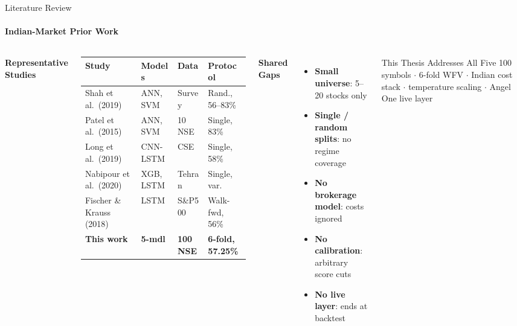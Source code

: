 \documentclass[10pt,aspectratio=43]{beamer}
\newcommand{\hl}[1]{\textcolor{primary}{\textbf{#1}}}
\newcommand{\rd}[1]{\textcolor{tertiary}{\textbf{#1}}}
\newcommand{\gd}[1]{\textcolor{secondary}{\textbf{#1}}}
\newcommand{\vsep}{\vspace{0.04cm}}
\newcommand{\AS}{\renewcommand{\arraystretch}{1.15}}
\begin{document}
\begin{frame}{Literature Review}
  \framesubtitle{Indian-Market Prior Work}
  \begin{columns}[T]
      \gd{\textbf{Representative Studies}}
      \vsep
      \AS\scriptsize
      \begin{tabular}{p{1.95cm} p{1.25cm} p{0.95cm} p{1.85cm}}
        \toprule
        \textbf{Study} & \textbf{Models} & \textbf{Data} & \textbf{Protocol} \\
        \midrule
        Shah et al.\ (2019)     & ANN, SVM & Survey  & Rand., 56--83\% \\
        Patel et al.\ (2015)    & ANN, SVM & 10 NSE  & Single, 83\% \\
        Long et al.\ (2019)     & CNN-LSTM & CSE     & Single, 58\% \\
        Nabipour et al.\ (2020) & XGB, LSTM & Tehran  & Single, var. \\
        Fischer \& Krauss (2018)& LSTM     & S\&P500 & Walk-fwd, 56\% \\
        \midrule
        \textbf{This work} & \textbf{5-mdl} & \textbf{100 NSE} & \hl{6-fold, 57.25\%} \\
        \bottomrule
      \end{tabular}
      \gd{\textbf{Shared Gaps}}
      \vsep
      \begin{itemize}\itemsep3pt
        \item \rd{Small universe}: 5--20 stocks only
        \item \rd{Single / random splits}: no regime coverage
        \item \rd{No brokerage model}: costs ignored
        \item \rd{No calibration}: arbitrary score cuts
        \item \rd{No live layer}: ends at backtest
      \end{itemize}
      \vsep
      \begin{exampleblock}{This Thesis Addresses All Five}
        \scriptsize
        100 symbols $\cdot$ 6-fold WFV $\cdot$ Indian cost stack $\cdot$ temperature scaling $\cdot$ Angel One live layer
      \end{exampleblock}
  \end{columns}
\end{frame}
\end{document}
